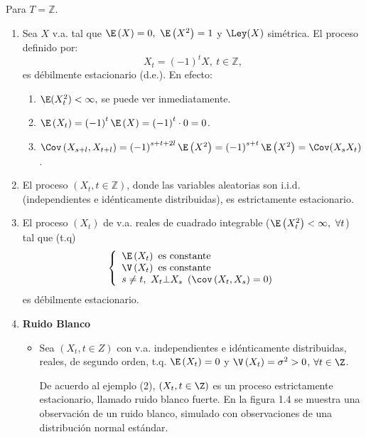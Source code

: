 \begin{ejemplo}
 Para $T=\mathbb{Z}$.

\begin{enumerate}
\item Sea $X$ v.a. tal que $\E\left( X \right)=0,\ \E\left( X^{2} \right)=1$ y $\Ley(X)$ sim\'{e}trica. El proceso definido por:
\[
X_{t}={(-1)}^{t}X,\ t\in \mathbb{Z},
\]
es d\'{e}bilmente estacionario (d.e.). En efecto:
\begin{enumerate}
\item $\E(X_{t}^{2})<\infty ,$ se puede ver inmediatamente.
\item $\E\left( X_{t} \right)=\left( -1 \right)^{t}\E\left( X \right)=\left( -1 \right)^{t}\cdot 0=0$.
\item $\Cov\left( X_{s+l},X_{t+l} \right)=\left( -1 \right)^{s+t+2l}\E\left( X^{2} \right)=\left( -1 \right)^{s+t}\E\left( X^{2} \right)=\Cov(X_{s}X_{t})$.
\end{enumerate}

\item El proceso $(X_{t}, t\in \mathbb{Z})$, donde las variables aleatorias son i.i.d. (independientes e id\'{e}nticamente distribuidas), es estrictamente estacionario.

\item El proceso $(X_{t})$ de v.a. reales de cuadrado integrable ($\E\left( X_{t}^{2} \right)<\infty,\ \forall t$) tal que (t.q)
\[
\left\{ {\begin{array}{l}
 \E\left( X_{t} \right)\text{ es constante} \\ 
 \V\left( X_{t} \right)\text{ es constante} \\ 
 s\neq t,\ X_{t}\bot X_{s}\ \left(\cov\left( X_{t},X_{s} \right)=0 \right) \\ 
 \end{array}} \right.
\]
es d\'{e}bilmente estacionario.

\item \textbf{Ruido Blanco}
	\begin{itemize}
	\item Sea $(X_{t}, t\in Z)$ con v.a. independientes e id\'{e}nticamente distribuidas, reales, de segundo orden, t.q. $\E\left( X_{t} \right)=0$ y $\V\left( X_{t} \right)=\sigma^{2}>0$, $\forall t\in \Z$.\newline

De acuerdo al ejemplo (2), $(X_{t}, t\in \Z)$ es un proceso estrictamente estacionario, llamado ruido blanco fuerte. En la figura 1.4 se muestra una observaci\'{o}n de un ruido blanco, simulado con observaciones de una distribuci\'{o}n normal est\'{a}ndar.


\end{itemize}
\end{enumerate}
\end{ejemplo}
